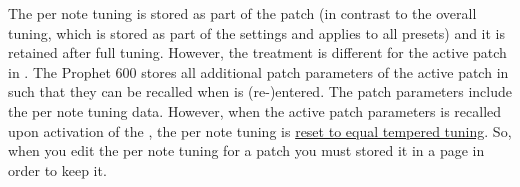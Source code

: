 The per note tuning is stored as part of the patch (in contrast to the overall tuning, which is stored as part of the settings and applies to all presets) and it is retained after full tuning. However, the treatment is different for the active patch in \livemode. The Prophet 600 stores all additional patch parameters of the active patch in \livemode such that they can be recalled when \livemode is (re-)entered. The patch parameters include the per note tuning data. However, when the active patch parameters is recalled upon activation of the \livemode, the per note tuning is \underline{reset to equal tempered tuning}. So, when you edit the per note tuning for a patch you must stored it in a page in order to keep it.
